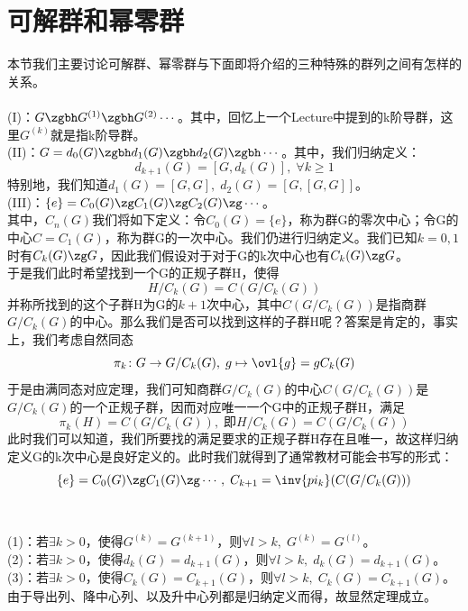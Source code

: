 \section{可解群和幂零群}
本节我们主要讨论可解群、幂零群与下面即将介绍的三种特殊的群列之间有怎样的关系。\\
\\
\indent (I)：$G\zgbh G^{(1)}\zgbh G^{(2)}\cdots$。其中，回忆上一个Lecture中提到的k阶导群，这里$G^{(k)}$就是指k阶导群。\\
\indent (II)：$G=d_0(G)\zgbh d_1(G)\zgbh d_2(G)\zgbh \cdots$。其中，我们归纳定义：
\[
d_{k+1}(G)=[G,d_k(G)],\; \forall k\geq 1
\]
特别地，我们知道$d_1(G)=[G,G],\; d_2(G)=[G,[G,G]]$。\\
\indent (III)：$\{e\}=C_0(G)\zg C_1(G)\zg C_2(G)\zg \cdots$。\\
\indent 其中，$C_n(G)$我们将如下定义：令$C_0(G)=\{e\}$，称为群G的零次中心；令G的中心$C=C_1(G)$，称为群G的一次中心。我们仍进行归纳定义。我们已知$k=0,1$时有$C_k(G)\zg G$，因此我们假设对于对于G的k次中心也有$C_k(G)\zg G$。\\
于是我们此时希望找到一个G的正规子群H，使得
\[
H/C_k(G)=C(G/C_k(G))
\]
并称所找到的这个子群H为G的$k+1$次中心，其中$C(G/C_k(G))$是指商群$G/C_k(G)$的中心。那么我们是否可以找到这样的子群H呢？答案是肯定的，事实上，我们考虑自然同态
\[
\pi_k\colon G\to G/C_k(G),\; g\mapsto\ovl{g}= gC_k(G)
\]
于是由满同态对应定理，我们可知商群$G/C_k(G)$的中心$C(G/C_k(G))$是$G/C_k(G)$的一个正规子群，因而对应唯一一个G中的正规子群H，满足
\[
\pi_k(H)=C(G/C_k(G)),\; \text{即}H/C_k(G)=C(G/C_k(G))
\]
此时我们可以知道，我们所要找的满足要求的正规子群H存在且唯一，故这样归纳定义G的k次中心是良好定义的。此时我们就得到了通常教材可能会书写的形式：
\[
\{e\}=C_0(G)\zg C_1(G)\zg \cdots,\; C_{k+1}=\inv{pi_k}(C(G/C_k(G)))
\]
\\
\\
\indent (1)：若$\exists k>0$，使得$G^{(k)}=G^{(k+1)}$，则$\forall l>k,\; G^{(k)}=G^{(l)}$。\\
\indent (2)：若$\exists k>0$，使得$d_k(G)=d_{k+1}(G)$，则$\forall l>k,\; d_k(G)=d_{k+1}(G)$。\\
\indent (3)：若$\exists k>0$，使得$C_k(G)=C_{k+1}(G)$，则$\forall l>k,\; C_k(G)=C_{k+1}(G)$。\\
由于导出列、降中心列、以及升中心列都是归纳定义而得，故显然定理成立。\\

